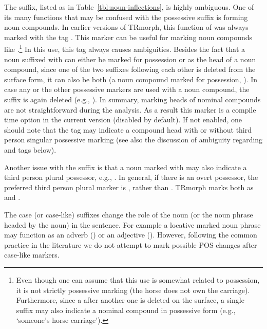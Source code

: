 \documentclass[twocolumn]{article}
\begin{document}
The  suffix, listed as  in
Table~\ref{tbl:noun-inflections}, is highly ambiguous. One of its many
functions that may be confused with the possessive suffix is forming
noun compounds. In earlier versions of TRmorph, this function of
 was always marked with the tag . This
marker can be useful for marking noun compounds like .\footnote{Even though one can assume
that this use is somewhat related to possession, it is not strictly
possessive marking (the horse does not own the carriage).
Furthermore, since a  after another one is deleted on the
surface, a single  suffix may also indicate a nominal
compound in possessive form (e.g., `someone's horse carriage').} In
this use, this tag always causes ambiguities. Besides the fact that a
noun suffixed with  can either be marked for possession or
as the head of a noun compound, since one of the two 
suffixes following each other is deleted from the surface form, it can
also be both (a noun compound marked for possession, ). In case any or the other
possessive markers are used with a noun compound, the suffix
 is again deleted (e.g., ). In summary, marking
heads of nominal compounds are not straightforward during the
analysis. As a result this marker is a compile time option in the
current version (disabled by default). If not enabled, one should note
that the tag  may indicate a compound head with or without
third person singular possessive marking (see also the discussion of
ambiguity regarding  and  tags below).

Another issue with the  suffix is that a noun marked with
 may also indicate a third person plural possessor, e.g.,
. In general, if there
is an overt possessor, the preferred third person plural marker is
, rather than . TRmorph marks  both
as  and .

The case (or case-like) suffixes change the role of the noun (or the
noun phrase headed by the noun) in the sentence. For example a
locative marked noun phrase may function as an adverb () or an adjective (). However, following the common practice in the literature we
do not attempt to mark possible POS changes after case-like markers.
\end{document}
